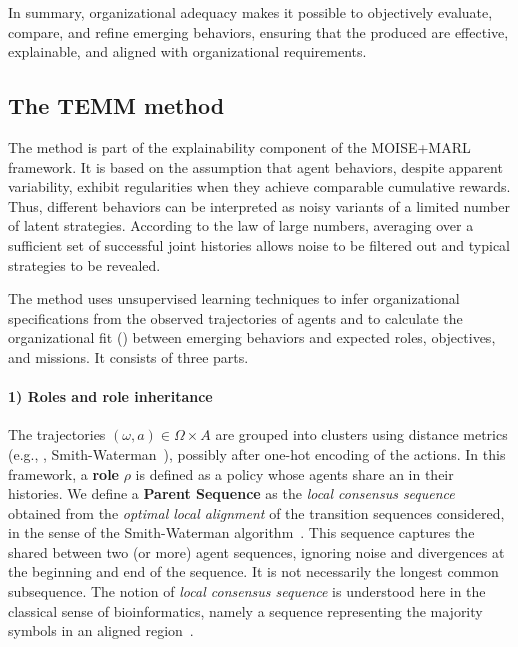 In summary, organizational adequacy makes it possible to objectively evaluate, compare, and refine emerging behaviors, ensuring that the  produced are effective, explainable, and aligned with organizational requirements.

\subsection{The TEMM method}
\label{sec:TEMM_algorithm}

The  method is part of the explainability component of the MOISE+MARL framework. It is based on the assumption that agent behaviors, despite apparent variability, exhibit regularities when they achieve comparable cumulative rewards. Thus, different behaviors can be interpreted as noisy variants of a limited number of latent strategies. According to the law of large numbers, averaging over a sufficient set of successful joint histories allows noise to be filtered out and typical strategies to be revealed.

The method uses unsupervised learning techniques to infer organizational specifications from the observed trajectories of agents and to calculate the organizational fit () between emerging behaviors and expected roles, objectives, and missions. It consists of three parts.

\paragraph{1) Roles and role inheritance}
The trajectories $(\omega, a) \in \Omega \times A$ are grouped into clusters using distance metrics (e.g., , Smith-Waterman~\cite{smith1981identification}), possibly after one-hot encoding of the actions.
In this framework, a \textbf{role} $\rho$ is defined as a policy whose agents share an  in their histories.
We define a \textbf{Parent Sequence} as the \textit{local consensus sequence} obtained from the \textit{optimal local alignment} of the transition sequences considered, in the sense of the Smith-Waterman algorithm~\cite{smith1981identification}.
This sequence captures the  shared between two (or more) agent sequences, ignoring noise and divergences at the beginning and end of the sequence.
It is not necessarily the longest common subsequence.
The notion of \textit{local consensus sequence} is understood here in the classical sense of bioinformatics, namely a sequence representing the majority symbols in an aligned region~\cite{meshConsensusSequence,sternke2020consensus,schneider1990sequence}.

